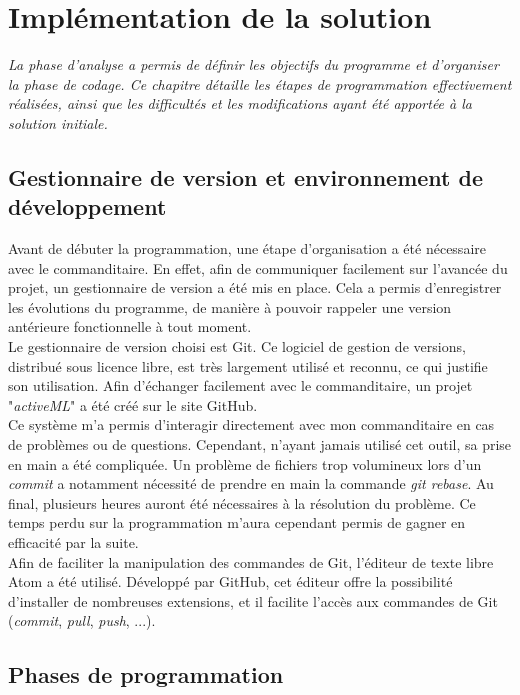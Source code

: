 \chapter[Implémentation de la solution]{Implémentation de la solution}

\textit{La phase d'analyse a permis de définir les objectifs du programme et d'organiser la phase de codage. Ce chapitre détaille les étapes de programmation effectivement réalisées, ainsi que les difficultés et les modifications ayant été apportée à la solution initiale.}

\section{Gestionnaire de version et environnement de développement}

Avant de débuter la programmation, une étape d'organisation a été nécessaire avec le commanditaire. En effet, afin de communiquer facilement sur l'avancée du projet, un gestionnaire de version a été mis en place. Cela a permis d'enregistrer les évolutions du programme, de manière à pouvoir rappeler une version antérieure fonctionnelle à tout moment. \\

Le gestionnaire de version choisi est Git. Ce logiciel de gestion de versions, distribué sous licence libre, est très largement utilisé et reconnu, ce qui justifie son utilisation. Afin d'échanger facilement avec le commanditaire, un projet "\textit{activeML}" a été créé sur le site GitHub. \\

Ce système m'a permis d'interagir directement avec mon commanditaire en cas de problèmes ou de questions. Cependant, n'ayant jamais utilisé cet outil, sa prise en main a été compliquée. Un problème de fichiers trop volumineux lors d'un \textit{commit} a notamment nécessité de prendre en main la commande \textit{git rebase}. Au final, plusieurs heures auront été nécessaires à la résolution du problème. Ce temps perdu sur la programmation m'aura cependant permis de gagner en efficacité par la suite. \\

Afin de faciliter la manipulation des commandes de Git, l'éditeur de texte libre Atom a été utilisé. Développé par GitHub, cet éditeur offre la possibilité d'installer de nombreuses extensions, et il facilite l'accès aux commandes de Git (\textit{commit}, \textit{pull}, \textit{push}, ...).


\section{Phases de programmation}


